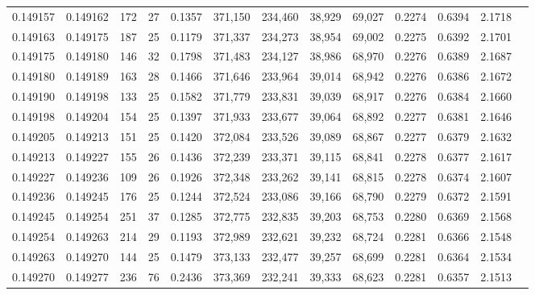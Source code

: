 \begin{tabular}{rrrrrrrrrrrrr}
0.149157 & 0.149162 & 172 &  27 &                                     0.1357 & 371,150 & 234,460 &  38,929 &  69,027 & 0.2274 & 0.6394 & 2.1718 \\
0.149163 & 0.149175 & 187 &  25 &                                     0.1179 & 371,337 & 234,273 &  38,954 &  69,002 & 0.2275 & 0.6392 & 2.1701 \\
0.149175 & 0.149180 & 146 &  32 &                                     0.1798 & 371,483 & 234,127 &  38,986 &  68,970 & 0.2276 & 0.6389 & 2.1687 \\
0.149180 & 0.149189 & 163 &  28 &                                     0.1466 & 371,646 & 233,964 &  39,014 &  68,942 & 0.2276 & 0.6386 & 2.1672 \\
0.149190 & 0.149198 & 133 &  25 &                                     0.1582 & 371,779 & 233,831 &  39,039 &  68,917 & 0.2276 & 0.6384 & 2.1660 \\
0.149198 & 0.149204 & 154 &  25 &                                     0.1397 & 371,933 & 233,677 &  39,064 &  68,892 & 0.2277 & 0.6381 & 2.1646 \\
0.149205 & 0.149213 & 151 &  25 &                                     0.1420 & 372,084 & 233,526 &  39,089 &  68,867 & 0.2277 & 0.6379 & 2.1632 \\
0.149213 & 0.149227 & 155 &  26 &                                     0.1436 & 372,239 & 233,371 &  39,115 &  68,841 & 0.2278 & 0.6377 & 2.1617 \\
0.149227 & 0.149236 & 109 &  26 &                                     0.1926 & 372,348 & 233,262 &  39,141 &  68,815 & 0.2278 & 0.6374 & 2.1607 \\
0.149236 & 0.149245 & 176 &  25 &                                     0.1244 & 372,524 & 233,086 &  39,166 &  68,790 & 0.2279 & 0.6372 & 2.1591 \\
0.149245 & 0.149254 & 251 &  37 &                                     0.1285 & 372,775 & 232,835 &  39,203 &  68,753 & 0.2280 & 0.6369 & 2.1568 \\
0.149254 & 0.149263 & 214 &  29 &                                     0.1193 & 372,989 & 232,621 &  39,232 &  68,724 & 0.2281 & 0.6366 & 2.1548 \\
0.149263 & 0.149270 & 144 &  25 &                                     0.1479 & 373,133 & 232,477 &  39,257 &  68,699 & 0.2281 & 0.6364 & 2.1534 \\
0.149270 & 0.149277 & 236 &  76 &                                     0.2436 & 373,369 & 232,241 &  39,333 &  68,623 & 0.2281 & 0.6357 & 2.1513 \\

\end{tabular}
